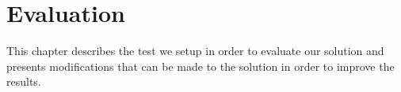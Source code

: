 \chapter{Evaluation}
\label{chap:evaluation}

This chapter describes the test we setup in order to evaluate our solution and presents modifications that can be made to the solution in order to improve the results.



